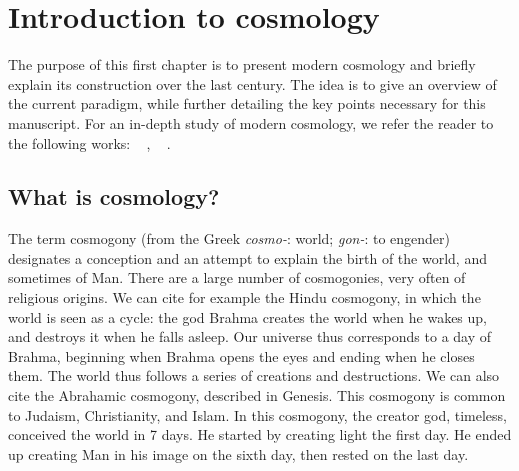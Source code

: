 \documentclass[11pt, twoside, a4paper, openright]{report}
\begin{document}

\graphicspath{{../figures/intro/}}

\chapter{Introduction to cosmology}
\minitoc
\newpage
\thispagestyle{fancy}

The purpose of this first chapter is to present modern cosmology and briefly explain its construction over the last century. The idea is to give an overview of the current paradigm, while further detailing the key points necessary for this manuscript. For an in-depth study of modern cosmology, we refer the reader to the following works: ~ \citet{Rich2010}, ~ \citet{Dodelson2003}.

\section{What is cosmology?}
The term cosmogony (from the Greek \emph{cosmo-}: world; \emph{gon-}: to engender) designates a conception and an attempt to explain the birth of the world, and sometimes of Man. There are a large number of cosmogonies, very often of religious origins. We can cite for example the Hindu cosmogony, in which the world is seen as a cycle: the god Brahma creates the world when he wakes up, and destroys it when he falls asleep. Our universe thus corresponds to a day of Brahma, beginning when Brahma opens the eyes and ending when he closes them. The world thus follows a series of creations and destructions.
We can also cite the Abrahamic cosmogony, described in Genesis. This cosmogony is common to Judaism, Christianity, and Islam. In this cosmogony, the creator god, timeless, conceived the world in 7 days. He started by creating light the first day. He ended up creating Man in his image on the sixth day, then rested on the last day.
\end{document}
